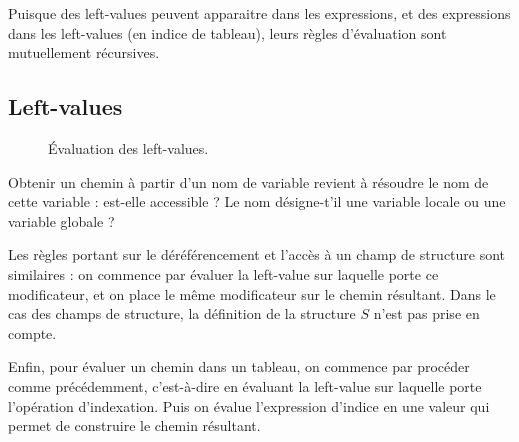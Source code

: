 Puisque des left-values peuvent apparaitre dans les expressions, et des
expressions dans les left-values (en indice de tableau), leurs règles
d'évaluation sont mutuellement récursives.

\subsection*{Left-values}

\begin{figure}

  \centering


  \caption{Évaluation des left-values.}
  \label{fig:eval-lv}
\end{figure}

Obtenir un chemin à partir d'un nom de variable revient à résoudre le nom de
cette variable : est-elle accessible ? Le nom désigne-t'il une variable locale
ou une variable globale ?

\begin{mathpar}
\end{mathpar}

Les règles portant sur le déréférencement et l'accès à un champ de structure
sont similaires : on commence par évaluer la left-value sur laquelle porte ce
modificateur, et on place le même modificateur sur le chemin résultant. Dans le
cas des champs de structure, la définition de la structure $S$ n'est pas prise
en compte.

\begin{mathpar}

\end{mathpar}

Enfin, pour évaluer un chemin dans un tableau, on commence par procéder comme
précédemment, c'est-à-dire en évaluant la left-value sur laquelle porte
l'opération d'indexation. Puis on évalue l'expression d'indice en une valeur qui
permet de construire le chemin résultant.

